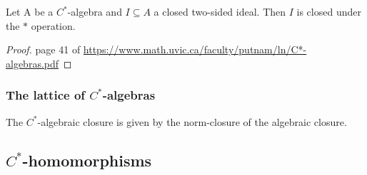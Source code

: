 \begin{proposition} \label{closedIdealIsStarIdeal}
Let A be a $C^*$-algebra and $I\subseteq A$ a closed two-sided ideal. Then $I$ is closed under the $*$ operation.
\end{proposition}
\begin{proof}
page 41 of \url{https://www.math.uvic.ca/faculty/putnam/ln/C*-algebras.pdf}
\end{proof}

\subsubsection{The lattice of $C^*$-algebras}
\begin{lemma}
The $C^*$-algebraic closure is given by the norm-closure of the algebraic closure.
\end{lemma}

\subsection{$C^*$-homomorphisms}

